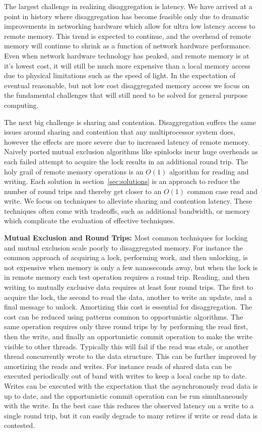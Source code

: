 The largest challenge in realizing disaggregation is latency. We have arrived at
a point in history where disaggregation has become feasible only due to dramatic
improvements in networking hardware which allow for ultra low latency access to
remote memory. This trend is expected to continue, and the overhead of remote
memory will continue to shrink as a function of network hardware performance.
Even when network hardware technology has peaked, and remote memory is at
it's lowest cost, it will still be much more expensive than a local memory
access due to physical limitations such as the speed of light. In the
expectation of eventual reasonable, but not low cost disaggregated memory access
we focus on the fundamental challenges that will still need to be solved for
general purpose computing. 

The next big challenge is sharing and contention. Disaggregation suffers the
same issues around sharing and contention that any multiprocessor system does,
however the effects are more severe due to increased latency of remote memory.
Naively ported mutual exclusion algorithms like spinlocks incur huge overheads
as each failed attempt to acquire the lock results in an additional round trip.
The holy grail of remote memory operations is an $O(1)$ algorithm for reading
and writing. Each solution in section~\ref{sec:solutions} is an approach to
reduce the number of round trips and thereby get closer to an $O(1)$ common case
read and write.  We focus on techniques to alleviate sharing and contention
latency. These techniques often come with tradeoffs, such as additional
bandwidth, or memory which complicate the evaluation of effective techniques.

\textbf{Mutual Exclusion and Round Trips:} 
Most common techniques for locking
and mutual exclusion scale poorly to disaggregated memory. For instance the
common approach of acquiring a lock, performing work, and then unlocking, is not
expensive when memory is only a few nanoseconds away, but when the lock is in
remote memory each test operation requires a round trip.  Reading, and then
writing to mutually exclusive data requires at least four round trips. The first
to acquire the lock, the second to read the data, another to write an update,
and a final message to unlock.  Amortizing this cost is essential for
disaggregation. The cost can be reduced using patterns common to opportunistic
algorithms. The same operation requires only three round trips by by performing
the read first, then the write, and finally an opportunistic commit operation to
make the write visible to other threads. Typically this will fail if the read
was stale, or another thread concurrently wrote to the data structure. This can
be further improved by amortizing the reads and writes. For instance reads of
shared data can be executed periodically out of band with writes to keep a local
cache up to date.  Writes can be executed with the expectation that the
asynchronously read data is up to date, and the opportunistic commit operation
can be run simultaneously with the write. In the best case this reduces the
observed latency on a write to a single round trip, but it can easily degrade to
many retires if write or read data is contested. 

